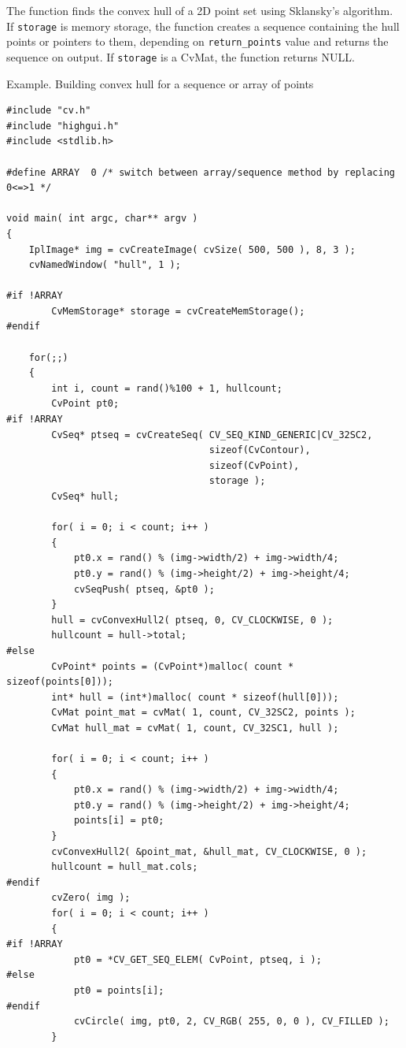 The function finds the convex hull of a 2D point set using Sklansky's algorithm. If \texttt{storage} is memory storage, the function creates a sequence containing the hull points or pointers to them, depending on \texttt{return\_points} value and returns the sequence on output.  If \texttt{storage} is a CvMat, the function returns NULL.

\ifC

Example. Building convex hull for a sequence or array of points

\begin{lstlisting}
#include "cv.h"
#include "highgui.h"
#include <stdlib.h>

#define ARRAY  0 /* switch between array/sequence method by replacing 0<=>1 */

void main( int argc, char** argv )
{
    IplImage* img = cvCreateImage( cvSize( 500, 500 ), 8, 3 );
    cvNamedWindow( "hull", 1 );

#if !ARRAY
        CvMemStorage* storage = cvCreateMemStorage();
#endif

    for(;;)
    {
        int i, count = rand()%100 + 1, hullcount;
        CvPoint pt0;
#if !ARRAY
        CvSeq* ptseq = cvCreateSeq( CV_SEQ_KIND_GENERIC|CV_32SC2,
                                    sizeof(CvContour),
                                    sizeof(CvPoint),
                                    storage );
        CvSeq* hull;

        for( i = 0; i < count; i++ )
        {
            pt0.x = rand() % (img->width/2) + img->width/4;
            pt0.y = rand() % (img->height/2) + img->height/4;
            cvSeqPush( ptseq, &pt0 );
        }
        hull = cvConvexHull2( ptseq, 0, CV_CLOCKWISE, 0 );
        hullcount = hull->total;
#else
        CvPoint* points = (CvPoint*)malloc( count * sizeof(points[0]));
        int* hull = (int*)malloc( count * sizeof(hull[0]));
        CvMat point_mat = cvMat( 1, count, CV_32SC2, points );
        CvMat hull_mat = cvMat( 1, count, CV_32SC1, hull );

        for( i = 0; i < count; i++ )
        {
            pt0.x = rand() % (img->width/2) + img->width/4;
            pt0.y = rand() % (img->height/2) + img->height/4;
            points[i] = pt0;
        }
        cvConvexHull2( &point_mat, &hull_mat, CV_CLOCKWISE, 0 );
        hullcount = hull_mat.cols;
#endif
        cvZero( img );
        for( i = 0; i < count; i++ )
        {
#if !ARRAY
            pt0 = *CV_GET_SEQ_ELEM( CvPoint, ptseq, i );
#else
            pt0 = points[i];
#endif
            cvCircle( img, pt0, 2, CV_RGB( 255, 0, 0 ), CV_FILLED );
        }


\end{lstlisting}
